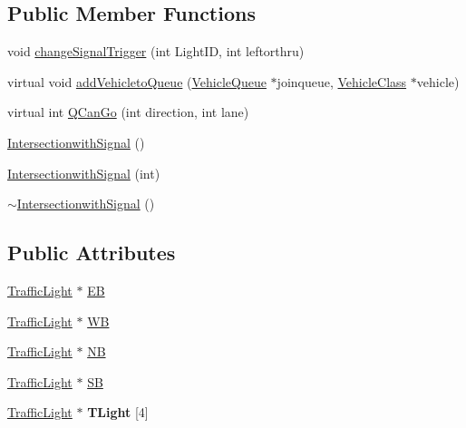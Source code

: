 \subsection*{Public Member Functions}
\begin{DoxyCompactItemize}
\item 
void \hyperlink{class_intersectionwith_signal_a78fbf7f154af7d788c0543b526c7d326}{change\-Signal\-Trigger} (int Light\-I\-D, int leftorthru)
\item 
virtual void \hyperlink{class_intersectionwith_signal_aa918c9a3033c16fac6bfa0e996677670}{add\-Vehicleto\-Queue} (\hyperlink{class_vehicle_queue}{Vehicle\-Queue} $\ast$joinqueue, \hyperlink{class_vehicle_class}{Vehicle\-Class} $\ast$vehicle)
\item 
virtual int \hyperlink{class_intersectionwith_signal_a3b2a6f1e258fcd15828ffb7e9e9881b3}{Q\-Can\-Go} (int direction, int lane)
\item 
\hyperlink{class_intersectionwith_signal_a2895da2acf740a52a4f8dd0673d3f46e}{Intersectionwith\-Signal} ()
\item 
\hyperlink{class_intersectionwith_signal_ab5eccdd602e1d9c0f6d39b5be79173d1}{Intersectionwith\-Signal} (int)
\item 
\hyperlink{class_intersectionwith_signal_a0baf29a021f4df049ad1ececeb3c1b11}{$\sim$\-Intersectionwith\-Signal} ()
\end{DoxyCompactItemize}
\subsection*{Public Attributes}
\begin{DoxyCompactItemize}
\item 
\hyperlink{class_traffic_light}{Traffic\-Light} $\ast$ \hyperlink{class_intersectionwith_signal_a8a57308329169b7c05acdeabfaa74206}{E\-B}
\item 
\hyperlink{class_traffic_light}{Traffic\-Light} $\ast$ \hyperlink{class_intersectionwith_signal_a5f321e72c10bb5a4ebeb6d314135fdbb}{W\-B}
\item 
\hyperlink{class_traffic_light}{Traffic\-Light} $\ast$ \hyperlink{class_intersectionwith_signal_af548458cb3fbe82d25a13fd9295406f7}{N\-B}
\item 
\hyperlink{class_traffic_light}{Traffic\-Light} $\ast$ \hyperlink{class_intersectionwith_signal_a19a6f5316f7d0ec4c08e6f80126b3e6c}{S\-B}
\item 
\hypertarget{class_intersectionwith_signal_a2c5e8c7432419eac922f8efa01a2f487}{\hyperlink{class_traffic_light}{Traffic\-Light} $\ast$ {\bfseries T\-Light} \mbox{[}4\mbox{]}}\label{class_intersectionwith_signal_a2c5e8c7432419eac922f8efa01a2f487}

\end{DoxyCompactItemize}
